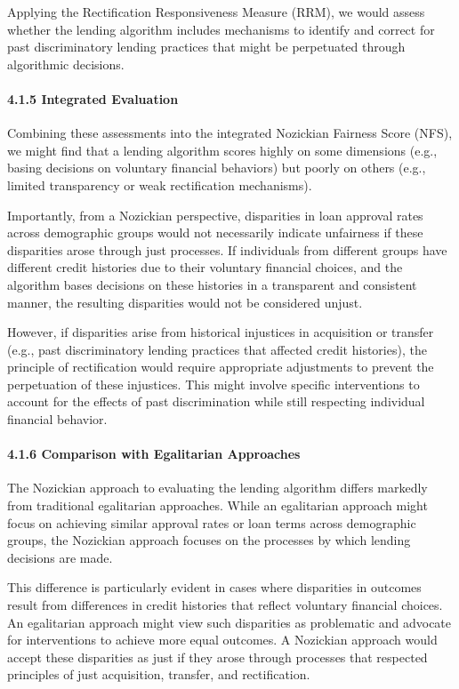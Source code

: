Applying the Rectification Responsiveness Measure (RRM), we would assess
whether the lending algorithm includes mechanisms to identify and
correct for past discriminatory lending practices that might be
perpetuated through algorithmic decisions.

\paragraph{4.1.5 Integrated Evaluation}\label{integrated-evaluation}

Combining these assessments into the integrated Nozickian Fairness Score
(NFS), we might find that a lending algorithm scores highly on some
dimensions (e.g., basing decisions on voluntary financial behaviors) but
poorly on others (e.g., limited transparency or weak rectification
mechanisms).

Importantly, from a Nozickian perspective, disparities in loan approval
rates across demographic groups would not necessarily indicate
unfairness if these disparities arose through just processes. If
individuals from different groups have different credit histories due to
their voluntary financial choices, and the algorithm bases decisions on
these histories in a transparent and consistent manner, the resulting
disparities would not be considered unjust.

However, if disparities arise from historical injustices in acquisition
or transfer (e.g., past discriminatory lending practices that affected
credit histories), the principle of rectification would require
appropriate adjustments to prevent the perpetuation of these injustices.
This might involve specific interventions to account for the effects of
past discrimination while still respecting individual financial
behavior.

\paragraph{4.1.6 Comparison with Egalitarian
Approaches}\label{comparison-with-egalitarian-approaches}

The Nozickian approach to evaluating the lending algorithm differs
markedly from traditional egalitarian approaches. While an egalitarian
approach might focus on achieving similar approval rates or loan terms
across demographic groups, the Nozickian approach focuses on the
processes by which lending decisions are made.

This difference is particularly evident in cases where disparities in
outcomes result from differences in credit histories that reflect
voluntary financial choices. An egalitarian approach might view such
disparities as problematic and advocate for interventions to achieve
more equal outcomes. A Nozickian approach would accept these disparities
as just if they arose through processes that respected principles of
just acquisition, transfer, and rectification.

